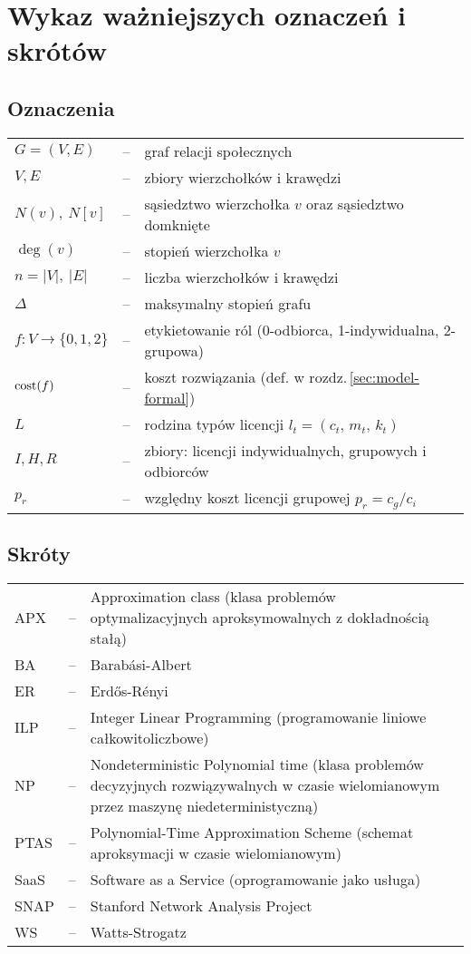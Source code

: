\chapter*{Wykaz ważniejszych oznaczeń i skrótów}

\section*{Oznaczenia}

\begin{tabular}{@{} l l p{} @{}}
    $G=(V,E)$    & -- & graf relacji społecznych \\
    $V,E$        & -- & zbiory wierzchołków i krawędzi \\
    $N(v),\ N[v]$ & -- & sąsiedztwo wierzchołka $v$ oraz sąsiedztwo domknięte \\
    $\deg(v)$    & -- & stopień wierzchołka $v$ \\
    $n=|V|,\ |E|$ & -- & liczba wierzchołków i krawędzi \\
    $\Delta$     & -- & maksymalny stopień grafu \\
    $f:V\to\{0,1,2\}$ & -- & etykietowanie ról (0-odbiorca, 1-indywidualna, 2-grupowa) \\
    $\operatorname{cost}(f)$   & -- & koszt rozwiązania (def. w rozdz.\,\ref{sec:model-formal}) \\
    $L$ & -- & rodzina typów licencji $l_t=(c_t,\,m_t,\,k_t)$ \\
    $I,H,R$      & -- & zbiory: licencji indywidualnych, grupowych i odbiorców \\
    $p_r$          & -- & względny koszt licencji grupowej $p_r=c_g/c_i$ \\
\end{tabular}

\section*{Skróty}

\begin{tabular}{@{} l l p{} @{}}
    APX  & -- & Approximation class (klasa problemów optymalizacyjnych aproksymowalnych z dokładnością stałą) \\
    BA   & -- & Barabási-Albert \\
    ER   & -- & Erdős-Rényi \\
    ILP  & -- & Integer Linear Programming (programowanie liniowe całkowitoliczbowe) \\
    NP   & -- & Nondeterministic Polynomial time (klasa problemów decyzyjnych rozwiązywalnych w czasie wielomianowym przez maszynę niedeterministyczną) \\
    PTAS & -- & Polynomial-Time Approximation Scheme (schemat aproksymacji w czasie wielomianowym) \\
    SaaS & -- & Software as a Service (oprogramowanie jako usługa) \\
    SNAP & -- & Stanford Network Analysis Project \\
    WS   & -- & Watts-Strogatz \\
\end{tabular}
